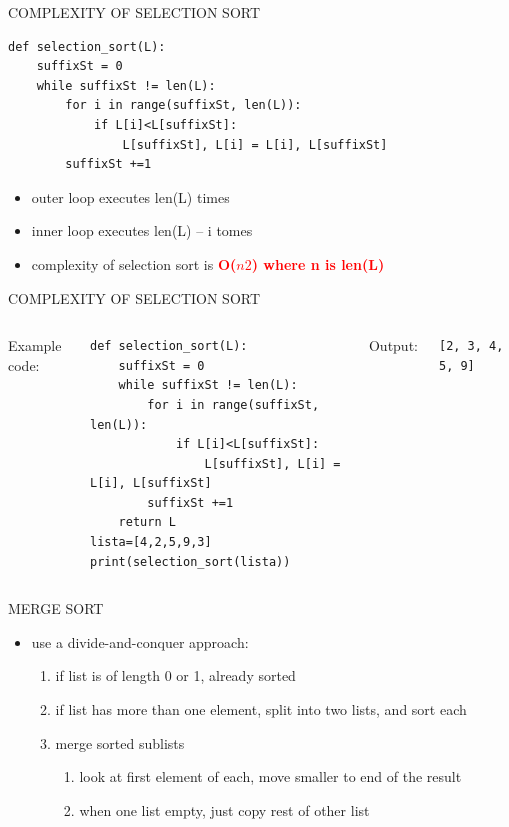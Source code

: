 \documentclass[aspectratio=169]{beamer}
\begin{document}
\begin{frame}[fragile]{COMPLEXITY OF SELECTION SORT}
\begin{lstlisting}
def selection_sort(L):
	suffixSt = 0
	while suffixSt != len(L):
		for i in range(suffixSt, len(L)):
			if L[i]<L[suffixSt]:
				L[suffixSt], L[i] = L[i], L[suffixSt]
		suffixSt +=1
\end{lstlisting}

\begin{itemize}
\item outer loop executes len(L) times
\item inner loop executes len(L) – i tomes
\item complexity of selection sort is \textcolor{red}{\textbf{O($n2$) where n is len(L)}}
\end{itemize}
\end{frame}

\begin{frame}[fragile]{COMPLEXITY OF SELECTION SORT}
\begin{columns}
Example code:
\begin{lstlisting}
def selection_sort(L):
    suffixSt = 0
    while suffixSt != len(L):
        for i in range(suffixSt, len(L)):
            if L[i]<L[suffixSt]:
                L[suffixSt], L[i] = L[i], L[suffixSt]
        suffixSt +=1
    return L
lista=[4,2,5,9,3]
print(selection_sort(lista))
\end{lstlisting}
Output:
\begin{block}{}
\begin{verbatim}
[2, 3, 4, 5, 9]
\end{verbatim}
\end{block}
\end{columns}
\end{frame}

\begin{frame}{MERGE SORT}
\begin{itemize}
\item use a divide-and-conquer approach:
\begin{enumerate}
\item if list is of length 0 or 1, already sorted
\item if list has more than one element, split into two lists, and sort each
\item merge sorted sublists
\begin{enumerate}
\item look at first element of each, move smaller to end of the result
\item when one list empty, just copy rest of other list
\end{enumerate}
\end{enumerate}
\end{itemize}
\end{frame}
\end{document}
